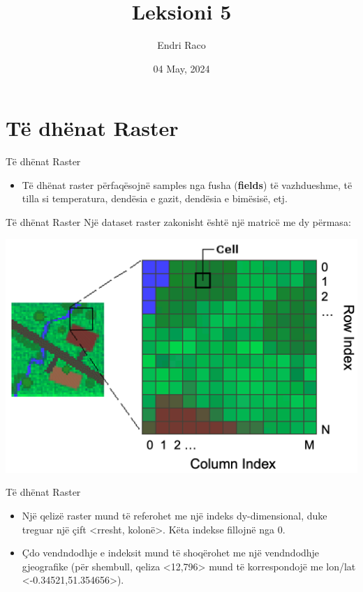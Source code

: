 \documentclass[
  ignorenonframetext,
]{beamer}
\title{Leksioni 5}
\author{Endri Raco}
\date{04 May, 2024}
\providecommand{\tightlist}{%
  \setlength{\itemsep}{0pt}\setlength{\parskip}{0pt}}
\begin{document}
\frame{\titlepage}

\begin{frame}[allowframebreaks]
  \tableofcontents[hideallsubsections]
\end{frame}
\hypertarget{tuxeb-dhuxebnat-raster}{%
\section{Të dhënat Raster}\label{tuxeb-dhuxebnat-raster}}

\begin{frame}{Të dhënat Raster}
\protect\hypertarget{tuxeb-dhuxebnat-raster-1}{}
\begin{itemize}
\tightlist
\item
  Të dhënat raster përfaqësojnë samples nga fusha (\textbf{fields}) të
  vazhdueshme, të tilla si temperatura, dendësia e gazit, dendësia e
  bimësisë, etj.
\end{itemize}
\end{frame}

\begin{frame}{Të dhënat Raster}
\protect\hypertarget{tuxeb-dhuxebnat-raster-2}{}
Një dataset raster zakonisht është një matricë me dy përmasa:

\includegraphics{./Figs/raster_matrix1.png}
\end{frame}

\begin{frame}{Të dhënat Raster}
\protect\hypertarget{tuxeb-dhuxebnat-raster-3}{}
\begin{itemize}
\item
  Një qelizë raster mund të referohet me një indeks dy-dimensional, duke
  treguar një çift \textless rresht, kolonë\textgreater. Këta indekse
  fillojnë nga 0.
\item
  Çdo vendndodhje e indeksit mund të shoqërohet me një vendndodhje
  gjeografike (për shembull, qeliza \textless12,796\textgreater{} mund
  të korrespondojë me lon/lat \textless-0.34521,51.354656\textgreater).
\end{itemize}
\end{frame}
\end{document}
